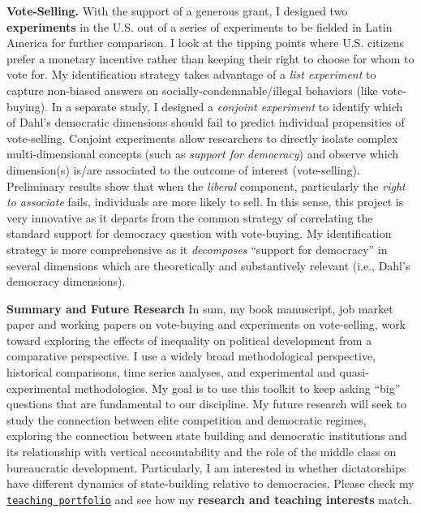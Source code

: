 \documentclass[10pt,stdletter,dateno,sigleft]{newlfm} %
\begin{document}
\begin{newlfm}
{\bf Vote-Selling.} With the support of a generous grant, I designed two {\bf experiments} in the U.S. out of a series of experiments to be fielded in Latin America for further comparison. I look at the tipping points where U.S. citizens prefer a monetary incentive rather than keeping their right to choose for whom to vote for. My identification strategy takes advantage of a \emph{list experiment} to capture non-biased answers on socially-condemnable/illegal behaviors (like vote-buying). In a separate study, I designed a \emph{conjoint experiment} to identify which of Dahl's democratic dimensions should fail to predict individual propensities of vote-selling. Conjoint experiments allow researchers to directly isolate complex multi-dimensional concepts (such as \emph{support for democracy}) and observe which dimension(s) is/are associated to the outcome of interest (vote-selling). Preliminary results show that when the \emph{liberal} component, particularly the \emph{right to associate} fails, individuals are more likely to sell. In this sense, this project is very innovative as it departs from the common strategy of correlating the standard support for democracy question with vote-buying. My identification strategy is more comprehensive as it \emph{decomposes} ``support for democracy'' in several dimensions which are theoretically and substantively relevant (i.e., Dahl's democracy dimensions). 


{\bf Summary and Future Research} In sum, my book manuscript, job market paper and working papers on vote-buying and experiments on vote-selling, work toward exploring the effects of inequality on political development from a comparative perspective. I use a widely broad methodological perspective, historical comparisons, time series analyses, and experimental and quasi-experimental methodologies. My goal is to use this toolkit to keep asking ``big'' questions that are fundamental to our discipline. My future research will seek to study the connection between elite competition and democratic regimes, exploring the connection between state building and democratic institutions and its relationship with vertical accountability and the role of the middle class on bureaucratic development. Particularly, I am interested in whether dictatorships have different dynamics of state-building relative to democracies. Please check my \href{http://www.hectorbahamonde.com/teaching/}{\texttt{teaching portfolio}} and see how my {\bf research and teaching interests} match.



\end{newlfm}
\end{document}

